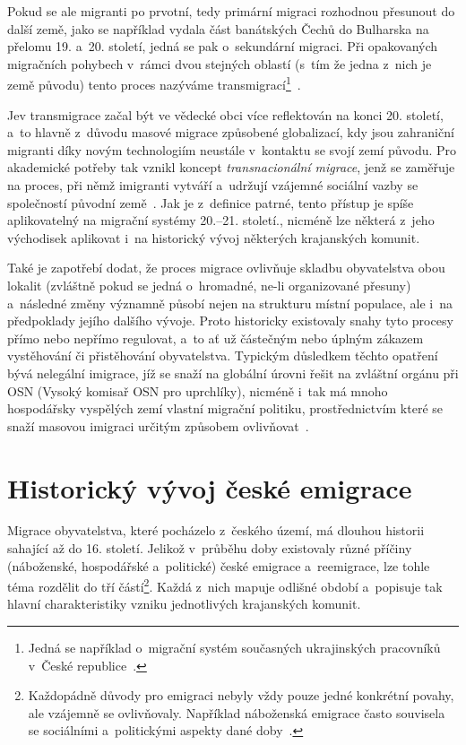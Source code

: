 Pokud se ale migranti po prvotní, tedy primární migraci rozhodnou přesunout do další země, jako se například vydala část banátských Čechů do Bulharska na přelomu 19. a~20. století, jedná se pak o~sekundární migraci. Při opakovaných migračních pohybech v~rámci dvou stejných oblastí (s~tím že jedna z~nich je země původu) tento proces nazýváme transmigrací\footnote{Jedná se například o~migrační systém současných ukrajinských pracovníků v~České republice~\parencite{Nespor2005}.}~\parencite{Nespor2005}.

Jev transmigrace začal být ve vědecké obci více reflektován na konci 20. století, a~to hlavně z~důvodu masové migrace způsobené globalizací, kdy jsou zahraniční migranti díky novým technologiím neustále v~kontaktu se svojí zemí původu. Pro akademické potřeby tak vznikl koncept \emph{transnacionální migrace}, jenž se zaměřuje na proces, při němž imigranti vytváří a~udržují vzájemné sociální vazby se společností původní země~\parencite{Kralova2013}. Jak je z~definice patrné, tento přístup je spíše aplikovatelný na migrační systémy 20.--21. století., nicméně lze některá z~jeho východisek aplikovat i~na historický vývoj některých krajanských komunit.

Také je zapotřebí dodat, že proces migrace ovlivňuje skladbu obyvatelstva obou lokalit (zvláštně pokud se jedná o~hromadné, ne-li organizované přesuny) a~následné změny významně působí nejen na strukturu místní populace, ale i~na předpoklady jejího dalšího vývoje. Proto historicky existovaly snahy tyto procesy přímo nebo nepřímo regulovat, a~to ať už částečným nebo úplným zákazem vystěhování či přistěhování obyvatelstva. Typickým důsledkem těchto opatření bývá nelegální imigrace, jíž se snaží na globální úrovni řešit na zvláštní orgánu při OSN (Vysoký komisař OSN pro uprchlíky), nicméně i~tak má mnoho hospodářsky vyspělých zemí vlastní migrační politiku, prostřednictvím které se snaží masovou imigraci určitým způsobem ovlivňovat~\parencite{Fialova2017a}.

\hypertarget{historickuxfd-vuxfdvoj-ux10deskuxe9-emigrace}{%
\section{Historický vývoj české emigrace}\label{historickuxfd-vuxfdvoj-ux10deskuxe9-emigrace}}

Migrace obyvatelstva, které pocházelo z~českého území, má dlouhou historii sahající až do 16. století. Jelikož v~průběhu doby existovaly různé příčiny (náboženské, hospodářské a~politické) české emigrace a~reemigrace, lze tohle téma rozdělit do tří částí\footnote{Každopádně důvody pro emigraci nebyly vždy pouze jedné konkrétní povahy, ale vzájemně se ovlivňovaly. Například náboženská emigrace často souvisela se sociálními a~politickými aspekty dané doby~\parencite{Vaculik2009a}.}. Každá z~nich mapuje odlišné období a~popisuje tak hlavní charakteristiky vzniku jednotlivých krajanských komunit.

